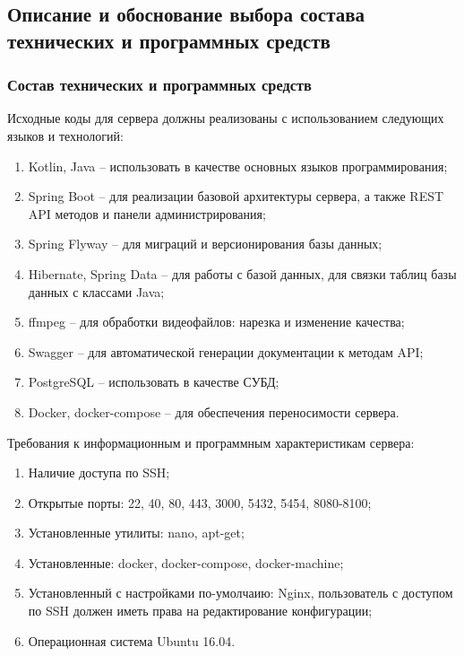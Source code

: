 \documentclass{../includes/TechDoc}
\begin{document}
    \clearpage

    \subsection{Описание и обоснование выбора состава технических и программных средств}

    \subsubsection{Состав технических и программных средств}

    Исходные коды для сервера должны реализованы с использованием следующих языков и технологий:
    \begin{enumerate}[noitemsep]
        \item Kotlin, Java -- использовать в качестве основных языков программирования;
        \item Spring Boot -- для реализации базовой архитектуры сервера, а также REST API методов и панели администрирования;
        \item Spring Flyway -- для миграций и версионирования базы данных;
        \item Hibernate, Spring Data -- для работы с базой данных, для связки таблиц базы данных с классами Java;
        \item ffmpeg -- для обработки видеофайлов: нарезка и изменение качества;
        \item Swagger -- для автоматической генерации документации к методам API;
        \item PostgreSQL -- использовать в качестве СУБД;
        \item Docker, docker-compose -- для обеспечения переносимости сервера.
    \end{enumerate}

    Требования к информационным и программным характеристикам сервера:
    \begin{enumerate}[noitemsep]
        \item Наличие доступа по SSH;
        \item Открытые порты: 22, 40, 80, 443, 3000, 5432, 5454, 8080-8100;
        \item Установленные утилиты: nano, apt-get;
        \item Установленные: docker, docker-compose, docker-machine;
        \item Установленный с настройками по-умолчаию: Nginx, пользователь с доступом по SSH должен иметь права
        на редактирование конфигурации;
        \item Операционная система Ubuntu 16.04.
    \end{enumerate}
\end{document}

